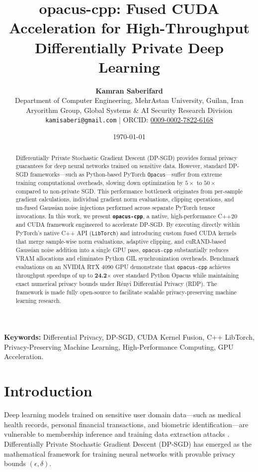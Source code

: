 \documentclass[11pt,onecolumn,a4paper]{article}
\title{\textbf{opacus-cpp: Fused CUDA Acceleration for High-Throughput Differentially Private Deep Learning}}
\author{
    \textbf{Kamran Saberifard}\\[0.5em]
    \small Department of Computer Engineering, MehrAstan University, Guilan, Iran\\
    \small Aryorithm Group, Global Systems \& AI Security Research Division\\
    \small \texttt{kamisaberi@gmail.com} | ORCID: \href{https://orcid.org/0009-0002-7822-6168}{0009-0002-7822-6168}
}
\date{\today}
\begin{document}
\maketitle

\begin{abstract}
Differentially Private Stochastic Gradient Descent (DP-SGD) provides formal privacy guarantees for deep neural networks trained on sensitive data. However, standard DP-SGD frameworks—such as Python-based PyTorch \texttt{Opacus}—suffer from extreme training computational overheads, slowing down optimization by $5\times$ to $50\times$ compared to non-private SGD. This performance bottleneck originates from per-sample gradient calculations, individual gradient norm evaluations, clipping operations, and un-fused Gaussian noise injections performed across separate PyTorch tensor invocations. In this work, we present \textbf{\texttt{opacus-cpp}}, a native, high-performance C++20 and CUDA framework engineered to accelerate DP-SGD. By executing directly within PyTorch's native C++ API (\texttt{LibTorch}) and introducing custom fused CUDA kernels that merge sample-wise norm evaluations, adaptive clipping, and cuRAND-based Gaussian noise addition into a single GPU pass, \texttt{opacus-cpp} substantially reduces VRAM allocations and eliminates Python GIL synchronization overheads. Benchmark evaluations on an NVIDIA RTX 4090 GPU demonstrate that \texttt{opacus-cpp} achieves throughput speedups of up to \textbf{24.2$\times$} over standard Python Opacus while maintaining exact numerical privacy bounds under Rényi Differential Privacy (RDP). The framework is made fully open-source to facilitate scalable privacy-preserving machine learning research.
\end{abstract}

\textbf{Keywords:} Differential Privacy, DP-SGD, CUDA Kernel Fusion, C++ LibTorch, Privacy-Preserving Machine Learning, High-Performance Computing, GPU Acceleration.

\hrulefill

\section{Introduction}
Deep learning models trained on sensitive user domain data—such as medical health records, personal financial transactions, and biometric identification—are vulnerable to membership inference and training data extraction attacks \cite{shokri2017membership, carlini2021extracting}. Differentially Private Stochastic Gradient Descent (DP-SGD) \cite{abadi2016deep} has emerged as the mathematical framework for training neural networks with provable privacy bounds $(\epsilon, \delta)$.
\end{document}
